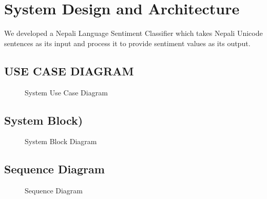 	\chapter{System Design and Architecture}
	    We developed a Nepali Language Sentiment Classifier which takes Nepali Unicode
sentences as its input and process it to provide sentiment values as its output.
        \section{USE CASE DIAGRAM}
          \begin{figure}[h]
		    \centering
			    \caption{System Use Case Diagram}
		\end{figure}
        \section{System Block)}
        	\begin{figure}[h]
		    \centering
			    \caption{System Block Diagram}
		\end{figure}
        
        \section{Sequence Diagram}
        \begin{figure}[h]
		    \centering
			    \caption{Sequence Diagram}
		\end{figure}